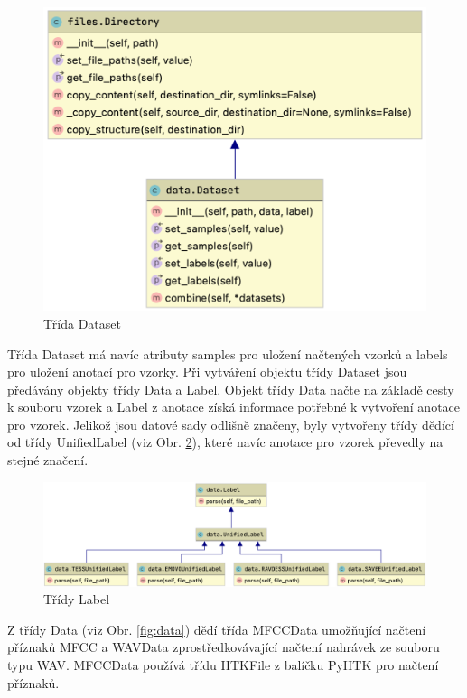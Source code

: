 \documentclass[FM,BP]{tulthesis}
\begin{document}
\begin{figure}[h!]
\centerline{\includegraphics[scale=.25,keepaspectratio]{data-dataset.png}}
\caption{Třída Dataset}
\label{fig:datasets}
\end{figure}
\FloatBarrier

Třída Dataset má navíc atributy samples pro uložení načtených vzorků a labels pro uložení anotací pro vzorky. Při vytváření objektu třídy Dataset jsou předávány objekty třídy Data a Label. Objekt třídy Data načte na základě cesty k souboru vzorek a Label z anotace získá informace potřebné k vytvoření anotace pro vzorek. Jelikož jsou datové sady odlišně značeny, byly vytvořeny třídy dědící od třídy UnifiedLabel (viz Obr. \ref{fig:label}), které navíc anotace pro vzorek převedly na stejné značení.

\begin{figure}[h]
\centerline{\includegraphics[scale=.25,keepaspectratio]{data-label.png}}
\caption{Třídy Label}
\label{fig:label}
\end{figure}
\FloatBarrier

Z třídy Data (viz Obr. \ref{fig:data}) dědí třída MFCCData umožňující načtení příznaků MFCC a WAVData zprostředkovávající načtení nahrávek ze souboru typu WAV. MFCCData používá třídu HTKFile z balíčku PyHTK pro načtení příznaků.
\end{document}
